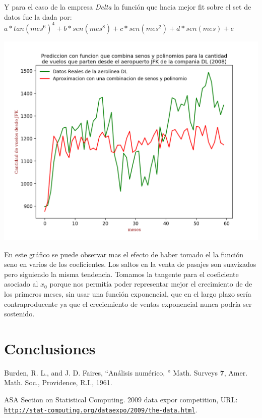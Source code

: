 \documentclass{endm}
\begin{document}
Y para el caso de la empresa \textit{Delta} la funci\'on que hacia mejor fit sobre el set de datos fue la dada por:
$a * tan(mes^6)^4 + b * sen(mes^8) + c * sen(mes^2) + d * sen(mes) +  e$


\begin{center}
\includegraphics[scale=0.6]{imagenes/DL.png}
\end{center}

En este gr\'afico se puede observar mas el efecto de haber tomado el la funci\'on seno en varios de los coeficientes. Los saltos en la venta de pasajes son suavizados pero siguiendo la misma tendencia. Tomamos la tangente para el coeficiente asociado al $x_0$ porque nos permit\'ia poder representar mejor el crecimiento de de los primeros meses, sin usar una funci\'on exponencial, que en el largo plazo ser\'ia contraproducente ya que el creciemiento de ventas exponencial nunca podr\'ia ser sostenido.



\section{Conclusiones}




\begin{thebibliography}{10}\label{bibliography}
  
 Burden, R. L., and J. D. Faires, ``An\'alisis num\'erico,
'' Math. Surveys \textbf{7}, Amer. Math. Soc.,
  Providence, R.I., 1961.
  
 ASA Section on Statistical Computing. 2009 data expor competition, URL:
  \href{http://stat-computing.org/dataexpo/2009/the-data.html}
  {\texttt{http://stat-computing.org/dataexpo/2009/the-data.html}}.

\end{thebibliography}
\end{document}
